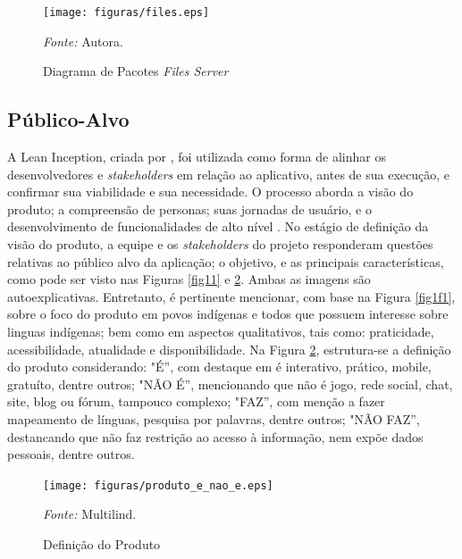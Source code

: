 \begin{figure}[h!]
	\centering
	\caption{Diagrama de Pacotes \textit{Files Server}}
	\begin{adjustbox}{center}
		\texttt{[image: figuras/files.eps]}
	\end{adjustbox}
	\begin{tablenotes}[flushleft]
		\centering
		\item \textit{Fonte:} Autora.
	\end{tablenotes}
	\label{fig10}
\end{figure}

\subsection{Público-Alvo}
\label{Publico-Alvo}
A Lean Inception, criada por , foi utilizada como forma de alinhar os desenvolvedores e \textit{stakeholders} em relação ao aplicativo, antes de sua execução, e confirmar sua viabilidade e sua necessidade. O processo aborda a visão do produto; a compreensão de personas; suas jornadas de usuário, e 
o desenvolvimento de funcionalidades de alto nível \cite{lean}. No estágio de definição da visão do produto, a equipe e os \textit{stakeholders} do projeto responderam questões relativas ao público alvo da aplicação; o objetivo, e as principais características, como pode ser visto nas 
Figuras \ref{fig11} e \ref{fig12}. Ambas as imagens são autoexplicativas. Entretanto, é pertinente mencionar, com base na Figura \ref{fig1f1}, sobre o foco do produto em povos indígenas e todos que possuem interesse sobre linguas indígenas; bem como em aspectos qualitativos, tais como: praticidade, acessibilidade, atualidade 
e disponibilidade. Na Figura \ref{fig12}, estrutura-se a definição do produto considerando: "É'', com destaque em é interativo, prático, mobile, gratuíto, dentre outros; "NÃO É'', mencionando que não é jogo, rede social, chat, site, blog ou fórum, tampouco complexo; "FAZ'', com menção a fazer mapeamento de línguas, 
pesquisa por palavras, dentre outros; "NÃO FAZ'', destancando que não faz restrição ao acesso à informação, nem expõe dados pessoais, dentre outros.

\begin{figure}[h!]
	\centering
	\caption{Definição do Produto}
	\begin{adjustbox}{center}
		\texttt{[image: figuras/produto\_e\_nao\_e.eps]}
	\end{adjustbox}
	\begin{tablenotes}[flushleft]
		\centering
		\item \textit{Fonte:} Multilind.
	\end{tablenotes}
	\label{fig12}
\end{figure}

